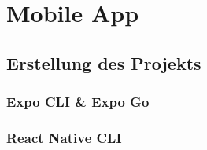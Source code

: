 \part{Mobile App}
\label{mobileApp}

\chapter{Erstellung des Projekts}
\section{Expo CLI & Expo Go}

\section{React Native CLI}



